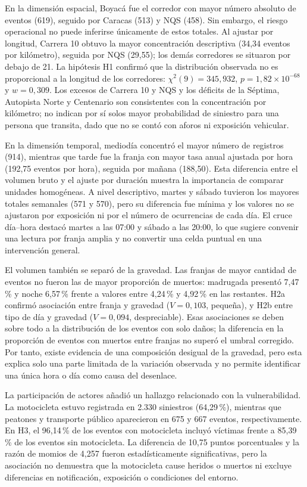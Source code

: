 \documentclass[12pt,letterpaper]{article}
\begin{document}
En la dimensión espacial, Boyacá fue el corredor con mayor número absoluto
de eventos (619), seguido por Caracas (513) y NQS (458). Sin embargo, el
riesgo operacional no puede inferirse únicamente de estos totales. Al ajustar
por longitud, Carrera 10 obtuvo la mayor concentración descriptiva (34,34
eventos por kilómetro), seguida por NQS (29,55); los demás corredores se
situaron por debajo de 21. La
hipótesis H1 confirmó que la distribución observada no es proporcional a la
longitud de los corredores: $\chi^2(9)=345{,}932$, $p=1{,}82\times10^{-68}$
y $w=0{,}309$. Los excesos de Carrera 10 y NQS y los déficits de la
Séptima, Autopista Norte y Centenario son consistentes con la concentración por kilómetro; no indican
por sí solos mayor probabilidad de siniestro para una persona que transita,
dado que no se contó con aforos ni exposición vehicular.

En la dimensión temporal, mediodía concentró el mayor número de registros
(914), mientras que tarde fue la franja con mayor tasa anual ajustada por
hora (192,75 eventos por hora), seguida por mañana (188,50). Esta diferencia
entre el volumen bruto y el ajuste por duración muestra la importancia de
comparar unidades homogéneas. A nivel descriptivo, martes y sábado tuvieron
los mayores totales semanales (571 y 570), pero su diferencia fue mínima y
los valores no se ajustaron por exposición ni por el número de ocurrencias
de cada día. El cruce día--hora destacó martes a las 07:00 y sábado a las
20:00, lo que sugiere convenir una lectura por franja amplia y no convertir
una celda puntual en una intervención general.

El volumen también se separó de la gravedad. Las franjas de mayor cantidad
de eventos no fueron las de mayor proporción de muertos: madrugada presentó
7,47\,\% y noche 6,57\,\% frente a valores entre 4,24\,\% y 4,92\,\% en las
restantes. H2a confirmó asociación entre franja y gravedad
($V=0{,}103$, pequeña), y H2b entre tipo de día y gravedad ($V=0{,}094$,
despreciable). Esas asociaciones se deben sobre todo a la distribución
de los eventos con solo daños; la diferencia en la proporción de eventos
con muertos entre franjas no superó el umbral corregido. Por tanto,
existe evidencia de una composición desigual de la gravedad, pero esta
explica solo una parte limitada de la variación observada y no permite
identificar una única hora o día como causa del desenlace.

La participación de actores añadió un hallazgo relacionado con la vulnerabilidad.
La motocicleta estuvo registrada en 2.330 siniestros (64,29\,\%), mientras
que peatones y transporte público aparecieron en 675 y 667 eventos,
respectivamente. En H3, el 96,14\,\% de los eventos con motocicleta incluyó
víctimas frente a 85,39\,\% de los eventos sin motocicleta. La diferencia de
10,75 puntos porcentuales y la razón de momios de 4,257 fueron estadísticamente
significativas, pero la asociación no demuestra que la motocicleta cause
heridos o muertos ni excluye diferencias en notificación, exposición o
condiciones del entorno.
\end{document}
